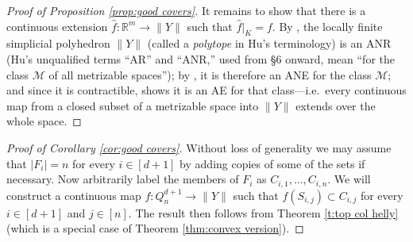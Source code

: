 \documentclass[12pt,a4paper,oneside]{amsart}\sloppy
\theoremstyle{definition}
\newcommand{\cubical}[2]{Q_{#1}^{#2}}
\newcommand{\slice}[2]{S_{#1,#2} }
\begin{document}
\begin{proof}[Proof of Proposition \ref{prop:good covers}]
It remains to show that there is a continuous extension $\hat{f} \colon \mathbb{R}^m \to \|Y\|$ such that $\hat{f}|_K = f$. By \cite[Ch.~III, Cor.~8.4]{Hu1965TheoryOfRetracts}, the locally finite simplicial polyhedron $\|Y\|$ (called a \emph{polytope} in Hu's terminology) is an ANR (Hu's unqualified terms ``AR'' and ``ANR,'' used from \S6 onward, mean ``for the class $\mathcal{M}$ of all metrizable spaces''); by \cite[Ch.~III, Thm.~3.2]{Hu1965TheoryOfRetracts}, it is therefore an ANE for the class $\mathcal{M}$; and since it is contractible, \cite[Ch.~II, Thm.~7.1]{Hu1965TheoryOfRetracts} shows it is an AE for that class---i.e.\ every continuous map from a closed subset of a metrizable space into $\|Y\|$ extends over the whole space.
\end{proof}

\begin{proof}[Proof of Corollary \ref{cor:good covers}]
Without loss of generality we may assume that $|F_i| = n$ for every $i \in [d+1]$ by adding copies of some of the sets if necessary. Now arbitrarily label the members of $F_i$ as 
$C_{i,1}, \dots, C_{i,n}$. We will construct a continuous map $f \colon \cubical{n}{d+1} \to \|Y\|$ such that 
$f(\slice{i}{j}) \subset C_{i,j}$
for every $i\in [d+1]$ and $j\in [n]$. The result then follows from Theorem \ref{t:top col helly} (which is a special case of Theorem \ref{thm:convex version}).


\end{proof}
\end{document}
